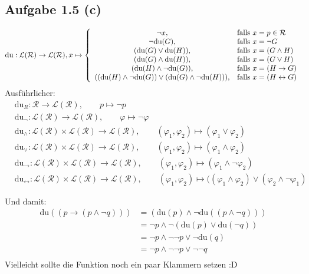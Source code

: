 \subsection*{Aufgabe 1.5 (c)}
\begin{align*}
	\text{du}:\mathcal{L}(\mathcal{R})\to\mathcal{L}(\mathcal{R}),x\mapsto \left\lbrace\begin{array}{cl}
		\neg x, & \text{falls } x=p\in\mathcal{R}\\
		\neg\text{du}(G), & \text{falls } x=\neg G\\
		(\text{du}(G)\vee\text{du}(H)), & \text{falls } x=(G\wedge H)\\
		(\text{du}(G)\wedge\text{du}(H)), & \text{falls } x=(G\vee H)\\
		(\text{du}(H)\wedge\neg\text{du}(G)), & \text{falls } x=(H\to G)\\
		((\text{du}(H)\wedge\neg \text{du}(G))\vee(\text{du}(G)\wedge\neg\text{du}(H))), & \text{falls } x=(H\leftrightarrow G)\\
	\end{array}\right.
\end{align*}
Ausführlicher:
\begin{align*}
	&\text{du}_R:\mathcal{R}\to\mathcal{L}(\mathcal{R}),\qquad p\mapsto\neg p\\
	&\text{du}_{\neg}:\mathcal{L}(\mathcal{R})\to\mathcal{L}(\mathcal{R}),\qquad\varphi\mapsto\neg\varphi\\
	&\text{du}_{\wedge}:\mathcal{L}(\mathcal{R})\times\mathcal{L}(\mathcal{R})\to\mathcal{L}(\mathcal{R}),\qquad(\varphi_1,\varphi_2)\mapsto(\varphi_1\vee\varphi_2)\\
	&\text{du}_{\vee}:\mathcal{L}(\mathcal{R})\times\mathcal{L}(\mathcal{R})\to\mathcal{L}(\mathcal{R}),\qquad(\varphi_1,\varphi_2)\mapsto(\varphi_1\wedge\varphi_2)\\
	&\text{du}_{\to}:\mathcal{L}(\mathcal{R})\times\mathcal{L}(\mathcal{R})\to\mathcal{L}(\mathcal{R}),\qquad(\varphi_1,\varphi_2)\mapsto(\varphi_1\wedge\neg\varphi_2)\\
	&\text{du}_{\leftrightarrow}:\mathcal{L}(\mathcal{R})\times\mathcal{L}(\mathcal{R})\to\mathcal{L}(\mathcal{R}),\qquad(\varphi_1,\varphi_2)\mapsto((\varphi_1\wedge\varphi_2)\vee(\varphi_2\wedge\neg\varphi_1)
\end{align*}

Und damit:
\begin{align*}
	\text{du}((p\to(p\wedge\neg q)))
	&=(\text{du}(p)\wedge\neg\text{du}((p\wedge\neg q)))\\
	&=\neg p\wedge\neg(\text{du}(p)\vee\text{du}(\neg q))\\
	&=\neg p\wedge\neg\neg p\vee\neg\text{du}(q)\\
	&=\neg p\wedge\neg\neg p\vee\neg\neg q\\
\end{align*}
Vielleicht sollte die Funktion noch ein paar Klammern setzen :D
